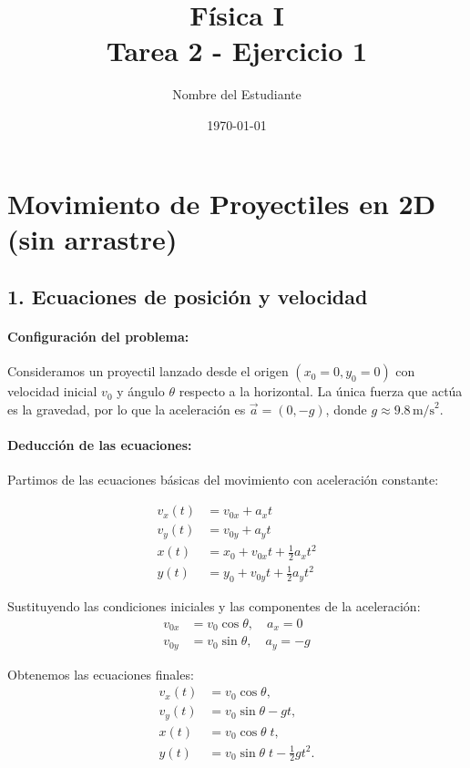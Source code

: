 \documentclass[12pt,a4paper]{article}
\title{Física I \\ \large Tarea 2 - Ejercicio 1}
\author{Nombre del Estudiante}
\date{\today}
\begin{document}
\maketitle

\section*{Movimiento de Proyectiles en 2D (sin arrastre)}

\subsection*{1. Ecuaciones de posición y velocidad}

\paragraph{Configuración del problema:} Consideramos un proyectil lanzado desde el origen $(x_0=0, y_0=0)$ con velocidad inicial $v_0$ y ángulo $\theta$ respecto a la horizontal. La única fuerza que actúa es la gravedad, por lo que la aceleración es $\vec a = (0, -g)$, donde $g \approx 9.8 \, \text{m/s}^2$.

\paragraph{Deducción de las ecuaciones:} Partimos de las ecuaciones básicas del movimiento con aceleración constante:

\begin{align*}
v_x(t) &= v_{0x} + a_x t \\
v_y(t) &= v_{0y} + a_y t \\
x(t) &= x_0 + v_{0x} t + \tfrac{1}{2} a_x t^2 \\
y(t) &= y_0 + v_{0y} t + \tfrac{1}{2} a_y t^2
\end{align*}

Sustituyendo las condiciones iniciales y las componentes de la aceleración:
\begin{align*}
v_{0x} &= v_0 \cos\theta, \quad a_x = 0 \\
v_{0y} &= v_0 \sin\theta, \quad a_y = -g
\end{align*}

Obtenemos las ecuaciones finales:
\begin{align*}
v_x(t) &= v_0 \cos\theta, \\
v_y(t) &= v_0 \sin\theta - g t, \\
x(t) &= v_0 \cos\theta \; t, \\
y(t) &= v_0 \sin\theta \; t - \tfrac{1}{2} g t^2.
\end{align*}
\end{document}
